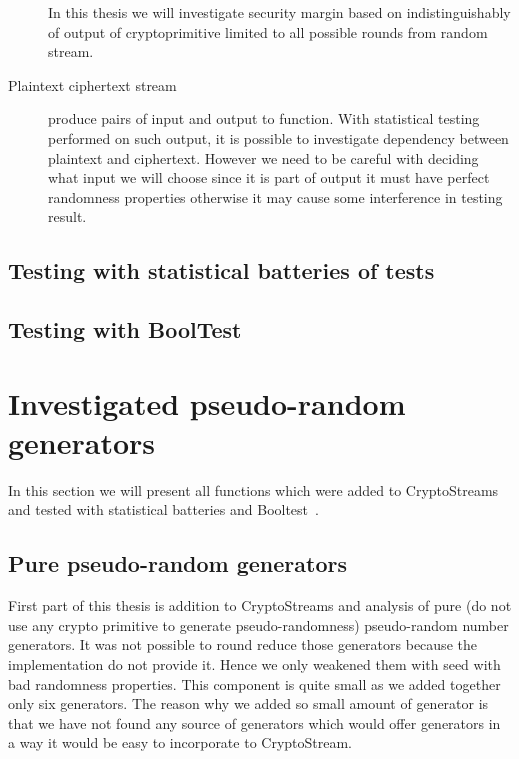 \documentclass[
    digital,    %
    oneside,    %
    color,
    11pt,
    nocover,
    notable,
    nolof,
    nolot,
    final
]{fithesis3}
\begin{document}
\begin{description}
	In this thesis we will investigate security margin based on indistinguishably of output of cryptoprimitive limited to all possible rounds from random stream.
	
	\item[Plaintext ciphertext stream] produce pairs of input and output to function. With statistical testing performed on such output, it is possible to investigate dependency between plaintext and ciphertext. However we need to be careful with deciding what input we will choose since it is part of output it must have perfect randomness properties otherwise it may cause some interference in testing result.

\end{description}

\subsection{Testing with statistical batteries of tests}
\subsection{Testing with BoolTest}

\section{Investigated pseudo-random generators}

In this section we will present all functions which were added to CryptoStreams and tested with statistical batteries and Booltest~\cite{booltest-secrypt2017}.

\subsection{Pure pseudo-random generators}

First part of this thesis is addition to CryptoStreams and analysis of pure (do not use any crypto primitive to generate pseudo-randomness) pseudo-random number generators. It was not possible to round reduce those generators because the implementation do not provide it. Hence we only weakened them with seed with bad randomness properties. This component is quite small as we added together only six generators. The reason why we added so small amount of generator is that we have not found any source of generators which would offer generators in a way it would be easy to incorporate to CryptoStream.
\end{document}
